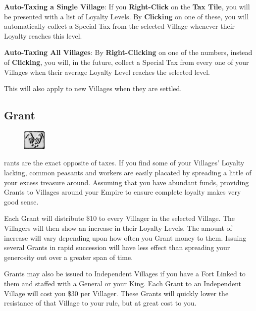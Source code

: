 \textbf{Auto-Taxing a Single Village}: If you \textbf{Right-Click} on the \textbf{Tax Tile}, you will be presented with a list of Loyalty Levels. By \textbf{Clicking} on one of these, you will automatically collect a Special Tax from the selected Village whenever their Loyalty reaches this level.

\textbf{Auto-Taxing All Villages}: By \textbf{Right-Clicking} on one of the numbers, instead of \textbf{Clicking}, you will, in the future, collect a Special Tax from every one of your Villages when their average Loyalty Level reaches the selected level.

This will also apply to new Villages when they are settled.

\subsection{\textsf{Grant}}


\begin{figure}
    \vspace{-20pt}
    \begin{center}
        \includegraphics[width=0.1\textwidth]{Tgrant}
    \end{center}
    \vspace{-20pt}
\end{figure}

rants are the exact opposite of taxes. If you find some of your Villages’ Loyalty lacking, common peasants and workers are easily placated by spreading a little of your excess treasure around. Assuming that you have abundant funds, providing Grants to Villages around your Empire to ensure complete loyalty makes very good sense.

Each Grant will distribute \$10 to every Villager in the selected Village. The Villagers will then show an increase in their Loyalty Levels. The amount of increase will vary depending upon how often you Grant money to them. Issuing several Grants in rapid succession will have less effect than spreading your generosity out over a greater span of time.


Grants may also be issued to Independent Villages if you have a Fort Linked to them and staffed with a General or your King. Each Grant to an Independent Village will cost you \$30 per Villager. These Grants will quickly lower the resistance of that Village to your rule, but at great cost to you.

